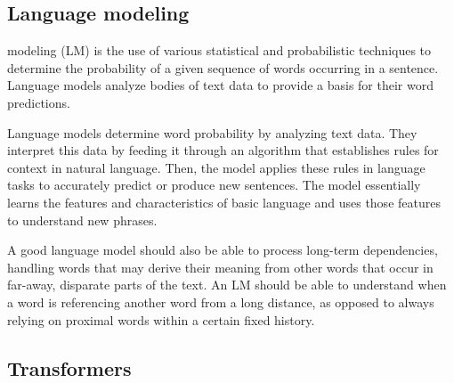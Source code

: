 \documentclass[journal,onecolumn]{IEEEtran}
\begin{document}
\subsection{Language modeling}
 modeling (LM) is the use of various statistical and probabilistic techniques to determine the probability of a given sequence of words occurring in a sentence. Language models analyze bodies of text data to provide a basis for their word predictions\cite{noauthor_what_nodate}.

Language models determine word probability by analyzing text data. They interpret this data by feeding it through an algorithm that establishes rules for context in natural language. Then, the model applies these rules in language tasks to accurately predict or produce new sentences. The model essentially learns the features and characteristics of basic language and uses those features to understand new phrases.

A good language model should also be able to process long-term dependencies, handling words that may derive their meaning from other words that occur in far-away, disparate parts of the text. An LM should be able to understand when a word is referencing another word from a long distance, as opposed to always relying on proximal words within a certain fixed history. 
\subsection{Transformers}
\end{document}
